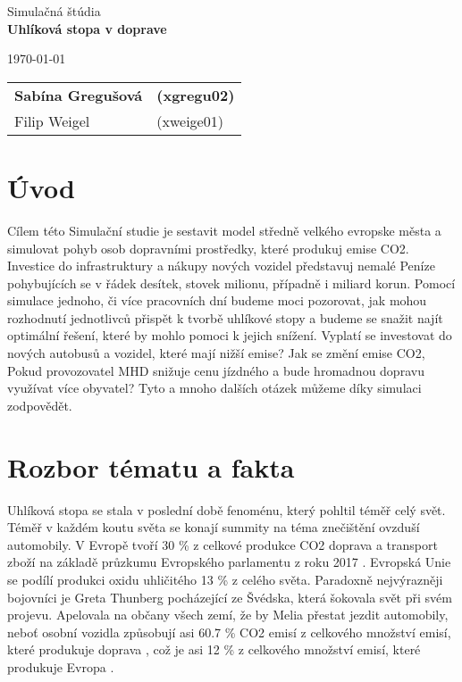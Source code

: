 \documentclass[a4paper, 11pt]{article}
\begin{document}
\begin{titlepage}
\begin{center}


\Huge{Simulačná štúdia} \\
\LARGE{\textbf{Uhlíková stopa v doprave}} \\

\end{center}

\begin{minipage}{0.5 \textwidth}
\Large
\today
\end{minipage}
\hfill
\begin{minipage}[r]{0.5 \textwidth}
\Large
\begin{tabular}{ll}
\textbf{Sabína Gregušová} & \textbf{(xgregu02)} \\
Filip Weigel & (xweige01)
\end{tabular}
\end{minipage}
\end{titlepage}

\clearpage
\tableofcontents


\clearpage
{}
\setcounter{page}{1}

\section{Úvod}
Cílem této Simulační studie je sestavit model středně velkého evropske města a simulovat pohyb osob dopravními prostředky, které produkuj emise CO2. Investice do infrastruktury a nákupy nových vozidel představuj nemalé Peníze pohybujících se v řádek desítek, stovek milionu, případně i miliard korun. Pomocí simulace jednoho, či více pracovních dní budeme moci pozorovat, jak mohou rozhodnutí jednotlivců přispět k tvorbě uhlíkové stopy a budeme se snažit najít optimální řešení, které by mohlo pomoci k jejich snížení. Vyplatí se investovat do nových autobusů a vozidel, které mají nižší emise? Jak se změní emise CO2, Pokud provozovatel MHD snižuje cenu jízdného a bude hromadnou dopravu využívat více obyvatel? Tyto a mnoho dalších otázek můžeme díky simulaci zodpovědět. 

\section{Rozbor tématu a fakta}
Uhlíková stopa se stala v poslední době fenoménu, který pohltil téměř celý svět. Téměř v každém koutu světa se konají summity na téma znečištění ovzduší automobily. V Evropě tvoří 30 \% z celkové produkce CO2 doprava a transport zboží na základě průzkumu Evropského parlamentu z roku 2017 \cite {co2_eu}. Evropská Unie se podílí produkci oxidu uhličitého 13 \% z celého světa. Paradoxně nejvýrazněji bojovníci je Greta Thunberg pocházející ze Švédska, která šokovala svět při svém projevu. Apelovala na občany všech zemí, že by Melia přestat jezdit automobily, neboť osobní vozidla způsobují asi 60.7 \% CO2 emisí z celkového množství emisí, které produkuje doprava \cite {co2_eu}, což je asi 12 \% z celkového množství emisí, které produkuje Evropa \cite {co2_eu_law}.
\end{document}
